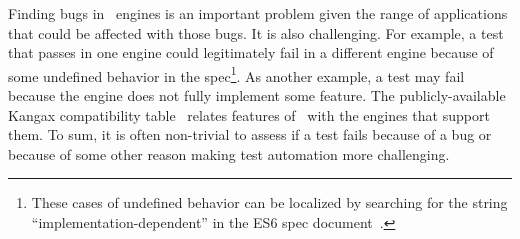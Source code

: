 \documentclass[10pt,conference,anonymous]{IEEEtran}
\begin{document}
Finding bugs in \js\ engines is an important problem given the range
of applications that could be affected with those
bugs. It is also
challenging. For example, a test that passes in one engine could
legitimately fail in a different engine because of some undefined
behavior in the spec\footnote{These cases of undefined behavior can be
  localized by searching for the string ``implementation-dependent''
  in the ES6 spec document~\cite{ecmas262-spec}.}. As another example,
a test may fail because the engine does not fully implement some
feature. The publicly-available Kangax compatibility
table~\cite{kangax} relates features of \js\ with the engines that
support them. To sum, it is often non-trivial to assess if a test
fails because of a bug or because of some other reason making test
automation more challenging.

\end{document}
